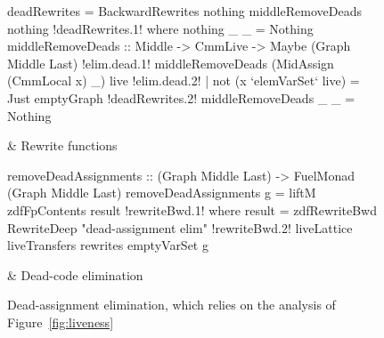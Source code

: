 \documentclass[blockstyle,preprint,natbib,nocopyrightspace]{sigplanconf}
\def\authornote#1{\unskip\relax}
\newcommand{\john}[1]{\authornote{JD: #1}}
\newcommand\figref[1]{Figure~\ref{fig:#1}}
\newcommand\figlabel[1]{\label{fig:#1}}
\begin{document}



\begin{figure*}
\begin{codetable}
\T\begin{code}
deadRewrites = BackwardRewrites nothing middleRemoveDeads nothing
!deadRewrites.1!  where nothing _ _ = Nothing
        middleRemoveDeads :: Middle -> CmmLive -> Maybe (Graph Middle Last)
!elim.dead.1!        middleRemoveDeads (MidAssign (CmmLocal x) _) live
!elim.dead.2!            | not (x `elemVarSet` live) = Just emptyGraph
!deadRewrites.2!        middleRemoveDeads _ _ = Nothing
\end{code}
\B
& Rewrite \mbox{functions}\\
\hline

\T\begin{code}
removeDeadAssignments :: (Graph Middle Last) -> FuelMonad (Graph Middle Last)
removeDeadAssignments g = liftM zdfFpContents result
!rewriteBwd.1!     where result = zdfRewriteBwd RewriteDeep "dead-assignment elim"
!rewriteBwd.2!                                  liveLattice liveTransfers rewrites emptyVarSet g
\end{code}
& \mbox{Dead-code} elimination\\
\end{codetable}
\caption{Dead-assignment elimination, which relies on the analysis of
\figref{liveness}} 
\figlabel{dead-elim}
\end{figure*}
\end{document}
